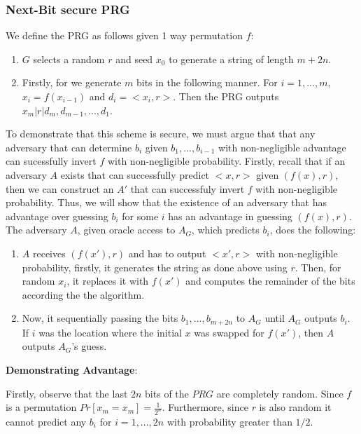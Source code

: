 \documentclass[11pt]{article}
\begin{document}
\subsubsection{Next-Bit secure PRG}
We define the PRG as follows given 1 way permutation $f$:
\begin{enumerate}
    \item $G$ selects a random $r$ and seed $x_0$ to generate a string of length $m + 2n$.
    \item Firstly, for we generate $m$ bits in the following manner. For $i=1,...,m$, $x_i = f(x_{i-1})$ and $d_i = <x_i, r>$. Then the PRG outputs $x_m | r | d_m,d_{m-1},...,d_{1}$.
\end{enumerate}
To demonstrate that this scheme is secure, we must argue that that any adversary that can determine $b_i$ given $b_{1},...,b_{i-1}$ with non-negligible advantage can sucessfully invert $f$ with non-negligible probability. Firstly, recall that if an adversary $A$ exists that can successfully predict $<x,r>$ given $(f(x),r)$, then we can construct an $A'$ that can successfuly invert $f$ with non-negligible probability. Thus, we will show that the existence of an adversary that has advantage over guessing $b_i$ for some $i$ has an advantage in guessing $(f(x),r)$. The adversary $A$, given oracle access to $A_G$, which predicts $b_i$, does the following:
\begin{enumerate}
    \item $A$ receives $(f(x'), r)$ and has to output $<x',r>$ with non-negligible probability, firstly, it generates the string as done above using $r$. Then, for random $x_i$, it replaces it with $f(x')$ and computes the remainder of the bits according the the algorithm.
    \item Now, it sequentially passing the bits $b_1,...,b_{m+2n}$ to $A_G$ until $A_G$ outputs $b_i$. If $i$ was the location where the initial $x$ was swapped for $f(x')$, then $A$ outputs $A_G$'s guess.
\end{enumerate}
\vspace{1em}

\textbf{Demonstrating Advantage}:
\vspace{1em}

Firstly, observe that the last $2n$ bits of the $PRG$ are completely random. Since $f$ is a permutation $Pr[x_m = x_m] = \frac{1}{2^n}$. Furthermore, since $r$ is also random it cannot predict any $b_i$ for $i=1,...,2n$ with probability greater than $1/2$.
\vspace{1em}
\end{document}
